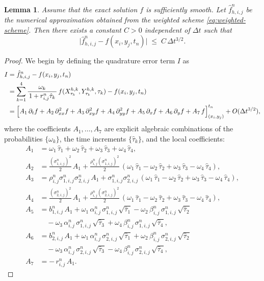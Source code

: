 \documentclass[11pt]{article}
\theoremstyle{mythm}
\newtheorem{lemma}{Lemma}
\theoremstyle{definition}
\begin{document}
	\begin{lemma}\label{a}
		Assume that the exact solution $f$ is sufficiently smooth. Let $\hat f_{h,i,j}^n$ be the numerical approximation obtained from the weighted scheme \eqref{eq:weighted-scheme}. Then there exists a constant $C>0$ independent of $\Delta t$ such that
		\[
		\bigl|\hat f_{h,i,j}^n - f(x_i, y_j, t_n)\bigr| \;\le\; C\,\Delta t^{3/2}.
		\]
	\end{lemma}
	
	\begin{proof}
		We begin by defining the quadrature error term $I$ as
		\[
		\begin{aligned}
			I &= \hat f_{h,i,j}^n - f(x_i, y_j, t_n) \\
			&= \sum_{k=1}^4 \frac{\omega_k}{\,1 + r_{i,j}^n\hat{\tau}_k\,}\,
			f(X_{\tau_k}^{h,k}, Y_{\tau_k}^{h,k}, \tau_k)
			- f(x_i, y_j, t_n)  \\
			&= \Bigl[ A_1\,\partial_t f + A_2\,\partial_{xx}^2 f + A_3\,\partial_{xy}^2 f
			+ A_4\,\partial_{yy}^2 f + A_5\,\partial_x f + A_6\,\partial_y f + A_7\,f \Bigr]_{(x_i,y_j)}^{t_n}
			+ O(\Delta t^{3/2}),
		\end{aligned}
		\]
		where the coefficients $A_1,\dots,A_7$ are explicit algebraic combinations of the probabilities $\{\omega_k\}$, the time increments $\{\hat\tau_k\}$, and the local coefficients:
		\[
		\begin{aligned}
			A_1 &= \omega_1\,\hat{\tau}_1 + \omega_2\,\hat{\tau}_2
			+ \omega_3\,\hat{\tau}_3 + \omega_4\,\hat{\tau}_4,\\
			A_2 &= \tfrac{(\sigma_{1,i,j}^n)^2}{2}\,A_1 + \tfrac{\rho_{i,j}^n(\sigma_{1,i,j}^n)^2}{2}\,
			(\omega_1\,\hat{\tau}_1 - \omega_2\,\hat{\tau}_2 + \omega_3\,\hat{\tau}_3 - \omega_4\,\hat{\tau}_4),\\
			A_3 &= \rho_{i,j}^n\sigma_{1,i,j}^n\sigma_{2,i,j}^n\,A_1
			+ \sigma_{1,i,j}^n\sigma_{2,i,j}^n\,
			(\omega_1\,\hat{\tau}_1 - \omega_2\,\hat{\tau}_2 + \omega_3\,\hat{\tau}_3 - \omega_4\,\hat{\tau}_4),\\
			A_4 &= \tfrac{(\sigma_{2,i,j}^n)^2}{2}\,A_1 + \tfrac{\rho_{i,j}^n(\sigma_{2,i,j}^n)^2}{2}\,
			(\omega_1\,\hat{\tau}_1 - \omega_2\,\hat{\tau}_2 + \omega_3\,\hat{\tau}_3 - \omega_4\,\hat{\tau}_4),\\
			A_5 &= b_{1,i,j}^n\,A_1 + \omega_1\,\alpha_{i,j}^n\,\sigma_{1,i,j}^n\,\sqrt{\hat\tau_1}
			- \omega_2\,\beta_{i,j}^n\,\sigma_{1,i,j}^n\,\sqrt{\hat\tau_2}\\
			&\quad - \omega_3\,\alpha_{i,j}^n\,\sigma_{1,i,j}^n\,\sqrt{\hat\tau_3}
			+ \omega_4\,\beta_{i,j}^n\,\sigma_{1,i,j}^n\,\sqrt{\hat\tau_4},\\
			A_6 &= b_{2,i,j}^n\,A_1 + \omega_1\,\alpha_{i,j}^n\,\sigma_{2,i,j}^n\,\sqrt{\hat\tau_1}
			+ \omega_2\,\beta_{i,j}^n\,\sigma_{2,i,j}^n\,\sqrt{\hat\tau_2}\\
			&\quad - \omega_3\,\alpha_{i,j}^n\,\sigma_{2,i,j}^n\,\sqrt{\hat\tau_3}
			- \omega_4\,\beta_{i,j}^n\,\sigma_{2,i,j}^n\,\sqrt{\hat\tau_4},\\
			A_7 &= -\,r_{i,j}^n\,A_1.
		\end{aligned}
		\]
		

\end{proof}
\end{document}
